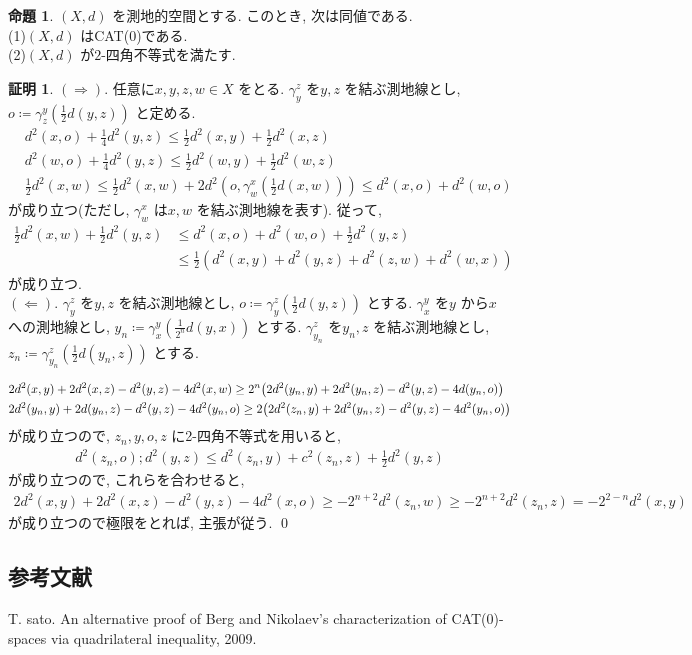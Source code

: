 \documentclass[10pt, fleqn, label-section=none]{bxjsarticle}
\theoremstyle{definition}
\newtheorem{prop}[dfn]{命題}
\newtheorem*{pf*}{証明}
\newcommand{\paren}[1]{\mleft( #1\mright )}
\newcommand{\naraba}{\Rightarrow}
\newcommand{\gyaku}{\Leftarrow}
\renewcommand{\;}{\, ; \,}
\begin{document}
\begin{prop}$(X, d)$ を測地的空間とする. このとき, 次は同値である. \\
(1)$(X, d)$ はCAT(0)である. \\
(2)$(X, d)$ が$2$-四角不等式を満たす. 
\end{prop}
\begin{pf*}
$(\naraba)$. 任意に$x, y, z, w \in X$ をとる. $ \gamma_y^z$ を$y, z$ を結ぶ測地線とし, $o \coloneqq \gamma_z^y(\frac{1}{2}d(y,z))$ と定める. 
\begin{align*} &d^2(x, o)  +  \frac{1}{4} d^2(y, z) \leq \frac{1}{2} d^2(x, y) +  \frac{1}{2} d^2(x, z)  
\\ &d^2(w, o)  +  \frac{1}{4} d^2(y, z) \leq \frac{1}{2} d^2(w, y) +  \frac{1}{2} d^2(w, z) 
\\& \frac{1}{2}d^2(x, w)  \leq  \frac{1}{2}d^2(x, w)  + 2 d^2(o, \gamma_w^x(\frac{1}{2}d(x,w))) \leq d^2(x, o) +  d^2(w, o) \end{align*}
が成り立つ(ただし, $\gamma_w^x$ は$x, w$ を結ぶ測地線を表す). 従って, 
\begin{align*} \frac{1}{2} d^2(x, w) + \frac{1}{2}d^2(y, z)& \leq d^2(x, o ) + d^2(w, o) + \frac{1}{2} d^2 (y, z)  \\&\leq \frac{1}{2}(d^2(x, y) + d^2(y, z) + d^2(z, w) + d^2(w, x)) \end{align*}
が成り立つ. \\
$(\gyaku)$. $\gamma_y^z$ を$y, z$ を結ぶ測地線とし, $o \coloneqq \gamma_y^z (\frac{1}{2} d(y, z))$ とする. $\gamma_x^y$ を$y$ から$x$ への測地線とし, $y_n \coloneqq \gamma_x^y (\frac{1}{2^n} d(y, x))$ とする. $\gamma_{y_n}^z$ を$y_n, z$ を結ぶ測地線とし, $z_n \coloneqq \gamma_{y_n}^z (\frac{1}{2} d(y_n, z))$ とする. 

\begin{align*}&2d^2(x, y) + 2d^2(x, z) - d^2(y, z) - 4d^2(x, w) \geq 2^n \paren{2d^2(y_n, y) + 2d^2(y_n, z) - d^2(y, z) - 4d(y_n, o)} 
\\& 2d^2(y_n, y) + 2d(y_n, z) - d^2(y, z) - 4d^2(y_n, o) \geq 2\paren{2d^2(z_n, y) + 2d^2(y_n, z) - d^2(y, z) - 4d^2(y_n, o)}\end{align*}
が成り立つので, $z_n, y, o, z$ に2-四角不等式を用いると, 
\begin{align*} d^2(z_n, o) ; d^2(y, z) \leq d^2(z_n, y) + c^2(z_n, z) + \frac{1}{2}d^2(y, z) \end{align*}
が成り立つので, これらを合わせると, 
\begin{align*} 2d^2(x,y) + 2d^2(x, z) - d^2(y, z) - 4d^2(x, o) \geq - 2^{n + 2} d^2(z_n, w) \geq -2^{n + 2} d^2(z_n, z) = - 2^{2 -n} d^2(x, y) \end{align*}
が成り立つので極限をとれば, 主張が従う. 
\qed
\end{pf*}



\subsection{参考文献}

T. sato. An alternative proof of Berg and Nikolaev's characterization of CAT(0)-spaces via quadrilateral inequality, 2009. 
\end{document}
